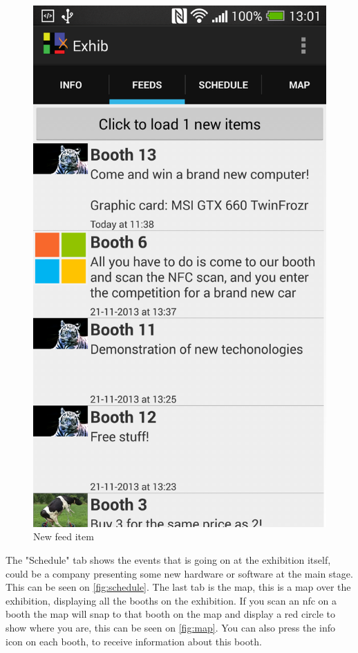 \begin{figure}[H]
\begin{minipage}[b]{0.5\columnwidth}
\includegraphics[width=\columnwidth]{img/finaldesign/feedsnewitem.png}
\caption{New feed item}
\label{fig:feedsnewitem}
\end{minipage}
\end{figure}

The "Schedule" tab shows the events that is going on at the exhibition itself, could be a company presenting some new hardware or software at the main stage. This can be seen on \autoref{fig:schedule}. The last tab is the map, this is a map over the exhibition, displaying all the booths on the exhibition. If you scan an \ac{nfc} on a booth the map will snap to that booth on the map and display a red circle to show where you are, this can be seen on \autoref{fig:map}. You can also press the info icon on each booth, to receive information about this booth.

